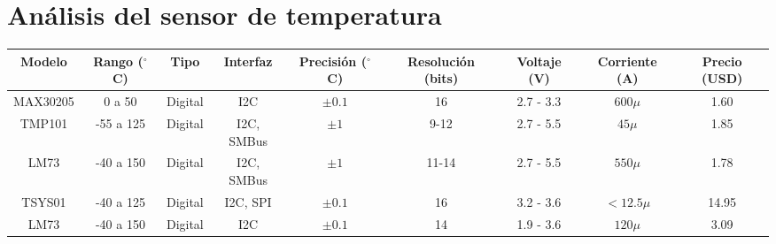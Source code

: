 
\section{Análisis del sensor de temperatura}
%		
%

\begin{center}
	\begin{sideways}
		\begin{tabulary}{10cm}{|c|c|c|c|c|c|c|c|c|}
			\hline
			Modelo&Rango ($^{\circ}$C)&Tipo&Interfaz&Precisión ($^{\circ}$C)&Resolución (bits)&Voltaje (V)&Corriente (A)&Precio (USD)\\
			\hline
			\hline
			MAX30205 & 0 a 50 & Digital& I2C& $\pm0.1$ &16 & 2.7 - 3.3&$600\mu$&1.60 \\
			\hline
			TMP101 & -55 a 125 & Digital& I2C, SMBus& $\pm1$ &9-12 & 2.7 - 5.5&$45\mu$&1.85 \\
			\hline
			LM73 & -40 a 150 & Digital& I2C, SMBus& $\pm1$ &11-14 & 2.7 - 5.5&$550\mu$&1.78 \\
			\hline
			TSYS01 & -40 a 125 & Digital& I2C, SPI& $\pm0.1$ &16 & 3.2 - 3.6&$< 12.5\mu$&14.95 \\
			\hline
			LM73 & -40 a 150 & Digital& I2C& $\pm0.1$ &14 & 1.9 - 3.6&$120\mu$&3.09 \\
			\hline
		\end{tabulary}
	\end{sideways}
\end{center}